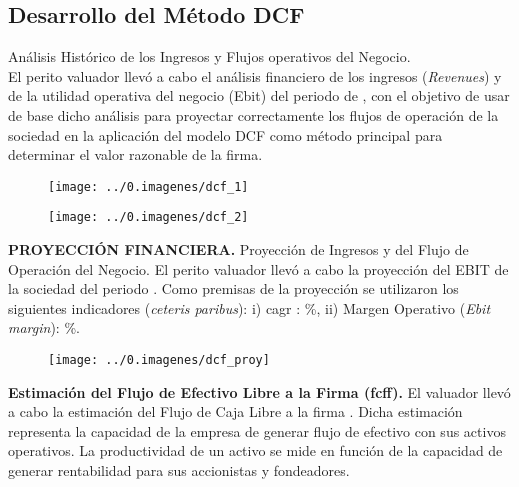 \subsection{Desarrollo del Método DCF}

\textcolor{principal}{An\'alisis Hist\'orico de los Ingresos y Flujos operativos del Negocio.}\\

El perito valuador llev\'o a cabo el an\'alisis financiero de los ingresos (\textit{Revenues}) y de la utilidad operativa del negocio (Ebit) del periodo de \EFdeHasta, con el objetivo de usar de base dicho an\'alisis para proyectar correctamente los flujos de operaci\'on de la sociedad en la aplicaci\'on del modelo DCF como m\'etodo principal para determinar el valor razonable de la firma.

\begin{figure}[H]
\centering
\texttt{[image: ../0.imagenes/dcf\_1]}
\end{figure}

\begin{figure}[H]
\centering
\texttt{[image: ../0.imagenes/dcf\_2]}
\end{figure}


\textcolor{principal}{\textbf{PROYECCI\'ON FINANCIERA.} Proyecci\'on de Ingresos y del Flujo de Operaci\'on del Negocio.} El perito valuador llev\'o a cabo la proyecci\'on del EBIT de la sociedad del periodo \periodoProyeccion. Como premisas de la proyecci\'on se utilizaron los siguientes indicadores (\textit{ceteris paribus}): i) \gls{cagr} \periodoProyeccion: \proyCagr\%, ii) Margen Operativo (\textit{Ebit margin}): \proyEbitMargin\%.

\begin{figure}[H]
\centering
\texttt{[image: ../0.imagenes/dcf\_proy]}
\end{figure}

\textbf{\textcolor{principal}{Estimaci\'on del Flujo de Efectivo Libre a la Firma (\gls{fcff}).}} El valuador llev\'o a cabo la estimaci\'on del Flujo de Caja Libre a la firma
. Dicha estimaci\'on representa la capacidad de la empresa de generar flujo de efectivo con sus activos operativos. La productividad de un activo se mide en funci\'on de la capacidad de generar rentabilidad para sus accionistas y fondeadores.\\

